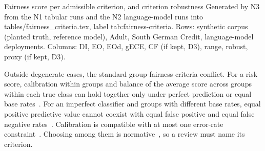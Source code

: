 

%
  {Fairness score per admissible criterion, and criterion robustness}%
  {Generated by N3 from the N1 tabular runs and the N2 language-model runs into tables/fairness\_criteria.tex, label tab:fairness-criteria. Rows: synthetic corpus (planted truth, reference model), Adult, South German Credit, language-model deployments. Columns: DI, EO, EOd, gECE, CF (if kept, D3), range, robust, proxy (if kept, D3).}

Outside degenerate cases, the standard group-fairness criteria conflict.
For a risk score, calibration within groups and balance of the average score across groups within each true class can hold together only under perfect prediction or equal base rates~\cite{kleinberg2017inherent}.
For an imperfect classifier and groups with different base rates, equal positive predictive value cannot coexist with equal false positive and equal false negative rates~\cite{chouldechova2017fair}.
Calibration is compatible with at most one error-rate constraint~\cite{pleiss2017fairness}.
Choosing among them is normative~\cite{barocas2023fairness}, so a review must name its criterion.


